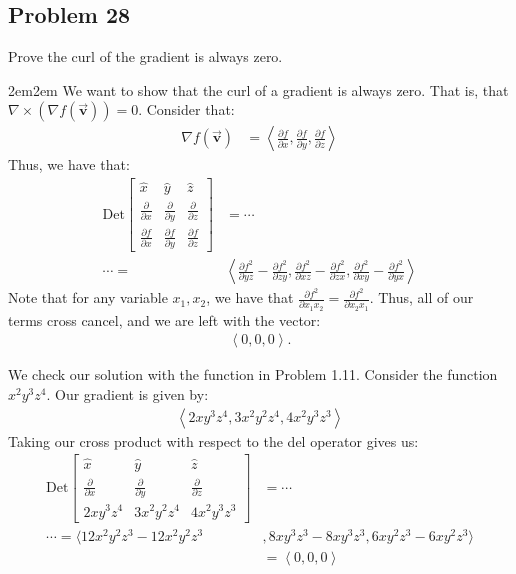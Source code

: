 \documentclass[10pt,oneside]{book}
\newcommand{\prt}[2]{\frac{\partial#1}{\partial#2}}
\let\endoldproof\endproof
\renewenvironment{proof}[1][\proofname]
  {\vspace{0.2cm}\begin{adjustwidth}{2em}{2em}
   \oldproof[#1]}
  {\endoldproof
\end{adjustwidth}}
\newcommand{\pvec}[1]{\left\langle#1\right\rangle}
\newcommand{\vv}{\vec{\mathbf{v}}}
\newcommand{\dps}{\displaystyle}
\newcommand{\delmatrix}[3]{\begin{bmatrix}\dps\hat x&\dps\hat y&\dps\hat z\\\dps\prt{}x&\dps\prt{}y&\dps\prt{}z\\\dps#1&\dps#2&\dps#3\end{bmatrix}}
\begin{document}
\subsection*{Problem 28}
Prove the curl of the gradient is always zero. 
\begin{proof}
  We want to show that the curl of a gradient is always zero. That is, that $\nabla \times (\nabla f(\vv)) = 0$. Consider that:
  \begin{align*}
    \nabla f(\vv)&= \pvec{\prt{f}{x}, \prt{f}{y}, \prt{f}{z}}
  \end{align*}
  Thus, we have that:
  \begin{align*}
    \text{Det}\delmatrix{\prt{f}{x}}{\prt{f}{y}}{\prt{f}{z}}&= \cdots\\
    \cdots =&\pvec{ \prt{f^2}{yz}-\prt{f^2}{zy}, \prt{f^2}{xz}-\prt{f^2}{zx}, \prt{f^2}{xy}-\prt{f^2}{yx}}
  \end{align*}
  Note that for any variable $x_1, x_2$, we have that $\prt{f^2}{x_1x_2} = \prt{f^2}{x_2x_1}$. Thus, all of our terms cross cancel, and we are left with the vector:
  \begin{align*}
    \pvec{0, 0, 0}.
  \end{align*}
\end{proof}\vspace{0.4cm}
We check our solution with the function in Problem 1.11. Consider the function $x^2y^3z^4$. Our gradient is given by:
\begin{align*}
  \pvec{2xy^3z^4, 3x^2y^2z^4, 4x^2y^3 z^3}
\end{align*}
Taking our cross product with respect to the del operator gives us:
\begin{align*}
  \text{Det}\delmatrix{2xy^3z^4}{3x^2y^2z^4}{4x^2y^3 z^3} &= \cdots\\
  \cdots = \langle12x^2y^2z^3 - 12x^2y^2z^3&, 8xy^3z^3 - 8xy^3z^3, 6xy^2z^3 - 6xy^2z^3\rangle\\
  &= \pvec{0,0,0}
\end{align*}
\end{document}
